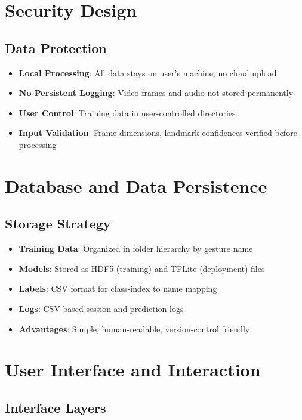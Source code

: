 \section{Security Design}

\subsection{Data Protection}

\begin{itemize}
    \item \textbf{Local Processing}: All data stays on user's machine; no cloud upload
    \item \textbf{No Persistent Logging}: Video frames and audio not stored permanently
    \item \textbf{User Control}: Training data in user-controlled directories
    \item \textbf{Input Validation}: Frame dimensions, landmark confidences verified before processing
\end{itemize}

\section{Database and Data Persistence}

\subsection{Storage Strategy}

\begin{itemize}
    \item \textbf{Training Data}: Organized in folder hierarchy by gesture name
    \item \textbf{Models}: Stored as HDF5 (training) and TFLite (deployment) files
    \item \textbf{Labels}: CSV format for class-index to name mapping
    \item \textbf{Logs}: CSV-based session and prediction logs
    \item \textbf{Advantages}: Simple, human-readable, version-control friendly
\end{itemize}

\section{User Interface and Interaction}

\subsection{Interface Layers}

